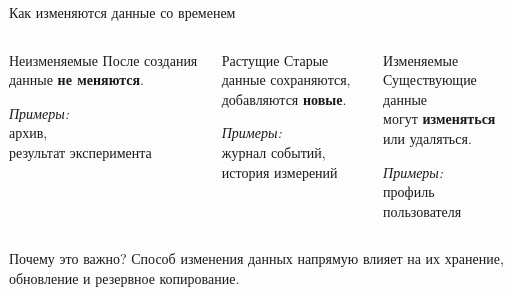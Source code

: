 \documentclass[aspectratio=169]{beamer}
\begin{document}
\begin{frame}{Как изменяются данные со временем}

\begin{columns}[T]
\begin{block}{\centering Неизменяемые}
\small
После создания данные \textbf{не меняются}.

\vspace{0.25cm}
\textit{Примеры:}\\
архив,\\
результат эксперимента
\end{block}

\begin{block}{\centering Растущие}
\small
Старые данные сохраняются,\\
добавляются \textbf{новые}.

\vspace{0.25cm}
\textit{Примеры:}\\
журнал событий,\\
история измерений
\end{block}

\begin{block}{\centering Изменяемые}
\small
Существующие данные\\
могут \textbf{изменяться} или удаляться.

\vspace{0.25cm}
\textit{Примеры:}\\
профиль пользователя
\end{block}
\end{columns}

\vspace{0.6cm}

\begin{alertblock}{Почему это важно?}
Способ изменения данных напрямую влияет на их хранение, обновление и резервное копирование.
\end{alertblock}

\end{frame}
\end{document}
